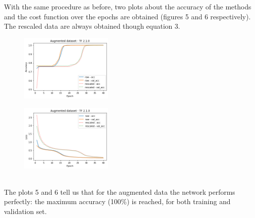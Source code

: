 \documentclass[prl,twocolumn]{revtex4-1}
\begin{document}
With the same procedure as before, two plots about the accuracy of the methods and the cost function over the epochs are obtained (figures 5 and 6 respectively). The rescaled data are always obtained though equation 3.
\begin{figure}[h]
	\includegraphics[width=0.40\textwidth]{aug_newTF.png}
	\caption{}
	\label{fig:y}
\end{figure}
\begin{figure}[h!!!]
	\includegraphics[width=0.40\textwidth]{aug_newTFloss.png}
	\caption{}
	\label{fig:y}
\end{figure}
\\
The plots 5 and 6 tell us that for the augmented data the network performs perfectly: the maximum accuracy (100\%) is reached, for both training and validation set.
\end{document}
